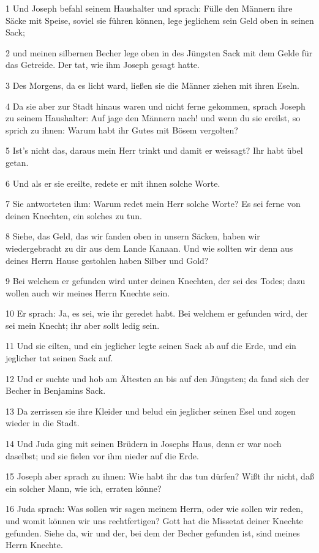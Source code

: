 \par 1 Und Joseph befahl seinem Haushalter und sprach: Fülle den Männern ihre Säcke mit Speise, soviel sie führen können, lege jeglichem sein Geld oben in seinen Sack;
\par 2 und meinen silbernen Becher lege oben in des Jüngsten Sack mit dem Gelde für das Getreide. Der tat, wie ihm Joseph gesagt hatte.
\par 3 Des Morgens, da es licht ward, ließen sie die Männer ziehen mit ihren Eseln.
\par 4 Da sie aber zur Stadt hinaus waren und nicht ferne gekommen, sprach Joseph zu seinem Haushalter: Auf jage den Männern nach! und wenn du sie ereilst, so sprich zu ihnen: Warum habt ihr Gutes mit Bösem vergolten?
\par 5 Ist's nicht das, daraus mein Herr trinkt und damit er weissagt? Ihr habt übel getan.
\par 6 Und als er sie ereilte, redete er mit ihnen solche Worte.
\par 7 Sie antworteten ihm: Warum redet mein Herr solche Worte? Es sei ferne von deinen Knechten, ein solches zu tun.
\par 8 Siehe, das Geld, das wir fanden oben in unsern Säcken, haben wir wiedergebracht zu dir aus dem Lande Kanaan. Und wie sollten wir denn aus deines Herrn Hause gestohlen haben Silber und Gold?
\par 9 Bei welchem er gefunden wird unter deinen Knechten, der sei des Todes; dazu wollen auch wir meines Herrn Knechte sein.
\par 10 Er sprach: Ja, es sei, wie ihr geredet habt. Bei welchem er gefunden wird, der sei mein Knecht; ihr aber sollt ledig sein.
\par 11 Und sie eilten, und ein jeglicher legte seinen Sack ab auf die Erde, und ein jeglicher tat seinen Sack auf.
\par 12 Und er suchte und hob am Ältesten an bis auf den Jüngsten; da fand sich der Becher in Benjamins Sack.
\par 13 Da zerrissen sie ihre Kleider und belud ein jeglicher seinen Esel und zogen wieder in die Stadt.
\par 14 Und Juda ging mit seinen Brüdern in Josephs Haus, denn er war noch daselbst; und sie fielen vor ihm nieder auf die Erde.
\par 15 Joseph aber sprach zu ihnen: Wie habt ihr das tun dürfen? Wißt ihr nicht, daß ein solcher Mann, wie ich, erraten könne?
\par 16 Juda sprach: Was sollen wir sagen meinem Herrn, oder wie sollen wir reden, und womit können wir uns rechtfertigen? Gott hat die Missetat deiner Knechte gefunden. Siehe da, wir und der, bei dem der Becher gefunden ist, sind meines Herrn Knechte.
